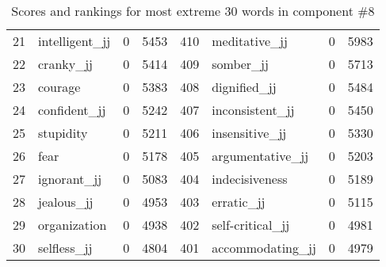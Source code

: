 \begin{table}[tbp]
\begin{tabular}{| rlr@{.}l | rlr@{.}l |}
    21 & intelligent\_jj & 0 & 5453    &    410 & meditative\_jj & 0 & 5983 \\
    22 & cranky\_jj & 0 & 5414    &    409 & somber\_jj & 0 & 5713 \\
    23 & courage & 0 & 5383    &    408 & dignified\_jj & 0 & 5484 \\
    24 & confident\_jj & 0 & 5242    &    407 & inconsistent\_jj & 0 & 5450 \\
    25 & stupidity & 0 & 5211    &    406 & insensitive\_jj & 0 & 5330 \\
    26 & fear & 0 & 5178    &    405 & argumentative\_jj & 0 & 5203 \\
    27 & ignorant\_jj & 0 & 5083    &    404 & indecisiveness & 0 & 5189 \\
    28 & jealous\_jj & 0 & 4953    &    403 & erratic\_jj & 0 & 5115 \\
    29 & organization & 0 & 4938    &    402 & self-critical\_jj & 0 & 4981 \\
    30 & selfless\_jj & 0 & 4804    &    401 & accommodating\_jj & 0 & 4979 \\
    \hline
    \end{tabular}
    \caption{Scores and rankings for most extreme 30 words in component \#8} 
\end{table}
\clearpage
